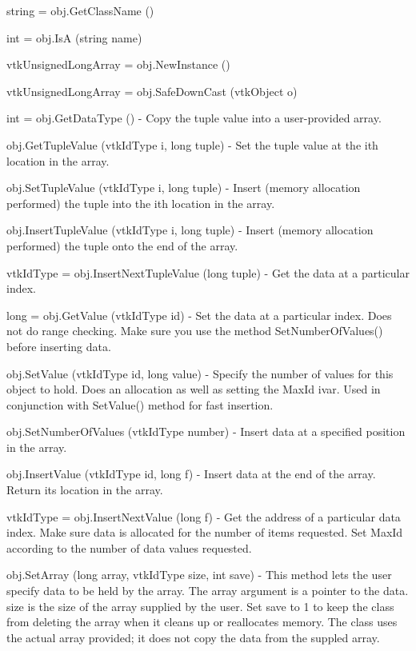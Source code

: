 \begin{DoxyItemize}
\item {\ttfamily string = obj.\-Get\-Class\-Name ()}  
\item {\ttfamily int = obj.\-Is\-A (string name)}  
\item {\ttfamily vtk\-Unsigned\-Long\-Array = obj.\-New\-Instance ()}  
\item {\ttfamily vtk\-Unsigned\-Long\-Array = obj.\-Safe\-Down\-Cast (vtk\-Object o)}  
\item {\ttfamily int = obj.\-Get\-Data\-Type ()} -\/ Copy the tuple value into a user-\/provided array.  
\item {\ttfamily obj.\-Get\-Tuple\-Value (vtk\-Id\-Type i, long tuple)} -\/ Set the tuple value at the ith location in the array.  
\item {\ttfamily obj.\-Set\-Tuple\-Value (vtk\-Id\-Type i, long tuple)} -\/ Insert (memory allocation performed) the tuple into the ith location in the array.  
\item {\ttfamily obj.\-Insert\-Tuple\-Value (vtk\-Id\-Type i, long tuple)} -\/ Insert (memory allocation performed) the tuple onto the end of the array.  
\item {\ttfamily vtk\-Id\-Type = obj.\-Insert\-Next\-Tuple\-Value (long tuple)} -\/ Get the data at a particular index.  
\item {\ttfamily long = obj.\-Get\-Value (vtk\-Id\-Type id)} -\/ Set the data at a particular index. Does not do range checking. Make sure you use the method Set\-Number\-Of\-Values() before inserting data.  
\item {\ttfamily obj.\-Set\-Value (vtk\-Id\-Type id, long value)} -\/ Specify the number of values for this object to hold. Does an allocation as well as setting the Max\-Id ivar. Used in conjunction with Set\-Value() method for fast insertion.  
\item {\ttfamily obj.\-Set\-Number\-Of\-Values (vtk\-Id\-Type number)} -\/ Insert data at a specified position in the array.  
\item {\ttfamily obj.\-Insert\-Value (vtk\-Id\-Type id, long f)} -\/ Insert data at the end of the array. Return its location in the array.  
\item {\ttfamily vtk\-Id\-Type = obj.\-Insert\-Next\-Value (long f)} -\/ Get the address of a particular data index. Make sure data is allocated for the number of items requested. Set Max\-Id according to the number of data values requested.  
\item {\ttfamily obj.\-Set\-Array (long array, vtk\-Id\-Type size, int save)} -\/ This method lets the user specify data to be held by the array. The array argument is a pointer to the data. size is the size of the array supplied by the user. Set save to 1 to keep the class from deleting the array when it cleans up or reallocates memory. The class uses the actual array provided; it does not copy the data from the suppled array.  

\end{DoxyItemize}
